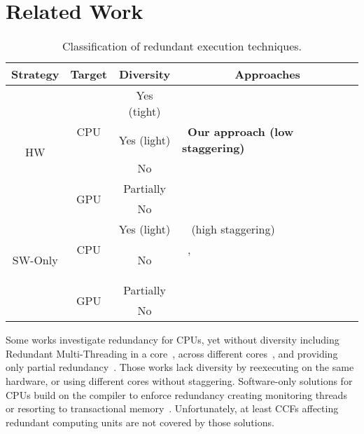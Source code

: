 \section{Related Work}
\label{sec:rel}

\begin{table}[t!]
\centering
\caption{Classification of redundant execution techniques.}
\label{table:Fault-Tolerant-Classification}
\begin{tabular}{|c|c|c|l|}
\hline
Strategy & Target & Diversity & \multicolumn{1}{c|}{Approaches} \\ \hline
\multirow{5}{*}{HW} & \multirow{3}{*}{CPU} & Yes (tight) & ~\cite{STlockstep,Iturbe2019,relaxing_criticallity} \\ \cline{3-4}
 &  & Yes (light) & ~\textbf{Our approach (low staggering)} \\ \cline{3-4}
 &  & No & ~\cite{Rotenberg1999,SMTredundancy,Mukherjee2002,Gomaa2003,dynamic_coupled_cores,on_demand_redundancy} \\ \cline{2-4}
 & \multirow{2}{*}{GPU} & Partially & ~\cite{SergiDATE} \\ \cline{3-4}
 &  & No & ~\cite{instruction_replication_gpu,Jeon2012,Swapcodes,Nathan2015} \\ \hline
\multirow{4}{*}{SW-Only} & \multirow{3}{*}{CPU} & Yes (light) & ~\cite{SergiDFT} (high staggering)\\ \cline{3-4}
 &  & \multirow{2}{*}{No} & ~\cite{Haas2017,Shye2007,Scales2010,Reis2005}, \\ %
 &  &    & ~\cite{So2018,Alhakeem2015,Shye2009,Mushtaq2013} \\ \cline{2-4}
 & \multirow{2}{*}{GPU} & Partially & ~\cite{SergiIOLTS} \\ \cline{3-4}
 &  & No & ~\cite{softwareapproaches_gpgpureliability,inter-intra-workgroup,Jain2019,Vargas2018} \\ \hline
\end{tabular}
\end{table}

Some works investigate redundancy for CPUs, yet without diversity including Redundant Multi-Threading in a core~\cite{SMTredundancy,Rotenberg1999}, across different cores~\cite{Mukherjee2002,Gomaa2003,dynamic_coupled_cores}, and providing only partial redundancy~\cite{relaxing_criticallity,on_demand_redundancy}. Those works lack diversity by reexecuting on the same hardware, or using different cores without staggering.
Software-only solutions for CPUs build on the compiler to enforce redundancy creating monitoring threads or resorting to transactional memory~\cite{Reis2005,So2018,Haas2017,Mushtaq2013,Shye2007,Shye2009}. Unfortunately, at least CCFs affecting redundant computing units are not covered by those solutions.

